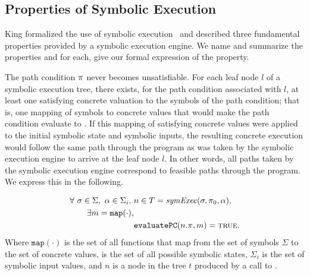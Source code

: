 \subsection{Properties of Symbolic Execution}
King formalized the use of symbolic execution~\cite{king1976symbolic} and
described three fundamental
properties provided by a symbolic execution engine. We name and summarize the properties
and for each, give our formal expression of the property.
\setcounter{property}{0}
\renewcommand{\theproperty}{K.\arabic{property}}
\begin{property}
  \label{prop:kingsound}
  The path condition $\pi$ never becomes unsatisfiable. For each
  leaf node $l$ of a symbolic execution tree, there exists, for the path condition
  associated with $l$, at
  least one satisfying concrete valuation to the symbols of the path
  condition; that is, one mapping of symbols to concrete values that
  would make the path condition evaluate to \texttrue. If this mapping of satisfying concrete values were
  applied to the initial symbolic state and symbolic inputs, the resulting
  concrete execution would follow the same path through the program as was taken
  by the symbolic execution engine to arrive at the leaf node $l$. In other
  words, all paths taken by the symbolic execution engine correspond to feasible
  paths through the program. We express this in the following. 
  

  \begin{align*}
    \forall ~\sigma \in \Sigma,~\alpha \in \Sigma_i,~& n \in T = \mathit{symExec}(\sigma,\pi_0,\alpha), \\
     \exists m = \mathtt{map(\cdot)}, \\
    & \mathtt{evaluatePC}(n.\pi,m) = \mathtt{\textsc{true}}.
  \end{align*}
  Where $\mathtt{map(\cdot)}$ is the set of all functions that map from the set
  of symbols $\Sigma$ to the set of concrete values, \symstates{} is the set of all
  possible symbolic states, $\Sigma_i$ is the set of symbolic input values, and $n$ is a node in the tree $t$ produced by a call
  to \symexecution.
\end{property}


